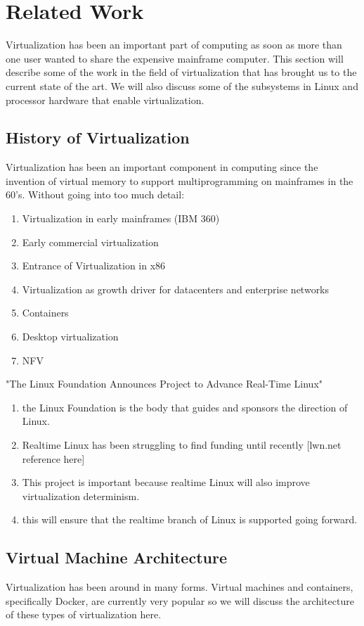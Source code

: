 \glsresetall
\chapter{Related Work}
\label{sec:related_work}
Virtualization has been an important part of computing as soon as more than one user wanted to share the 
expensive mainframe computer.  This section will describe some of the work in the field of 
virtualization that has brought us to the current state of the art.  We will also discuss some of the
subsystems in Linux and processor hardware that enable virtualization. 

\section{History of Virtualization}
\label{sec:history_vt}
Virtualization has been an important component in computing since the invention of virtual memory to support multiprogramming on mainframes in the 60's.  
Without going into too much detail:  
\begin{enumerate}
  \item Virtualization in early mainframes (IBM 360)
  \item Early commercial virtualization
  \item Entrance of Virtualization in x86
  \item Virtualization as growth driver for datacenters and enterprise networks
  \item Containers
  \item Desktop virtualization
  \item NFV
\end{enumerate}

"The Linux Foundation Announces Project to Advance Real-Time Linux" \autocite{_linux_foundation_1}
\begin{enumerate}
  \item the Linux Foundation is the body that guides and sponsors the direction of Linux.  
  \item Realtime Linux has been struggling to find funding until recently [lwn.net reference here] 
  \item This project is important because realtime Linux will also improve virtualization determinism.
  \item this will ensure that the realtime branch of Linux is supported going forward.  
\end{enumerate}


\section{Virtual Machine Architecture}
\label{sec:vm_arch}
Virtualization has been around in many forms.  Virtual machines and containers, specifically Docker, are currently 
very popular so we will discuss the architecture of these types of virtualization here.
